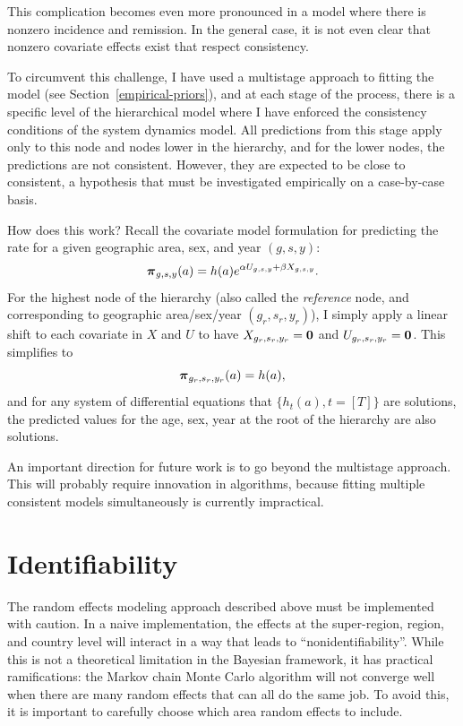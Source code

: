 This complication becomes even more pronounced in a model where there
is nonzero incidence and remission.  In the general case, it is not
even clear that nonzero covariate effects exist that respect
consistency.

To circumvent this challenge, I have used a multistage approach to
fitting the model (see Section~\ref{empirical-priors}), and at each
stage of the process, there is a specific level of the hierarchical
model where I have enforced the consistency conditions of the system
dynamics model.  All predictions from this stage apply only to this
node and nodes lower in the hierarchy, and for the lower nodes, the
predictions are not consistent.  However, they are expected to
be close to consistent, a hypothesis that must be investigated
empirically on a case-by-case basis.

How does this work?  Recall the covariate model formulation for
predicting the rate for a given geographic area, sex, and year $(g,s,y)$:
\[
{\boldsymbol{\pi}}_{g,s,y}(a) = h(a)e^{\alpha U_{g,s,y} + \beta X_{g,s,y}}.
\]
For the highest node of the hierarchy (also called the
\emph{reference} node, and corresponding to geographic area/sex/year $(g_r, s_r,
y_r)$), I simply apply a linear shift to each covariate in $X$ and $U$
to have $X_{{g_r},{s_r},{y_r}} = \mathbf{0}$ and $U_{g_r,s_r,y_r} = \mathbf{0}$.  This
simplifies to \[ {\boldsymbol{\pi}}_{g_r,s_r,y_r}(a) = h(a), \] and for any system
of differential equations that $\{h_t(a), t=[T]\}$ are
solutions, the predicted values for the age, sex, year at the root of
the hierarchy are also solutions.

An important direction for future work is to go beyond the multistage
approach.  This will probably require innovation in algorithms,
because fitting multiple consistent models simultaneously is currently
impractical.

\section{Identifiability}
The random effects modeling approach described above must be
implemented with caution.  In a naive implementation, the effects at
the super-region, region, and country level will interact in a way
that leads to ``nonidentifiability''.  While this is not a
theoretical limitation in the Bayesian framework, it has practical
ramifications: the Markov chain Monte Carlo algorithm will not converge well when there
are many random effects that can all do the same job.  To avoid this,
it is important to carefully choose which area random effects to include.

